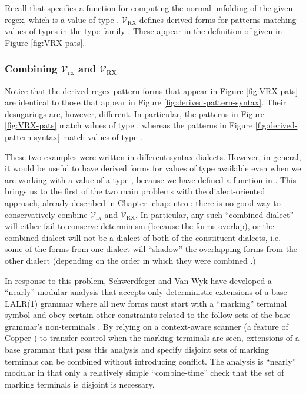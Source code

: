 {Recall that  specifies a function  for computing the normal unfolding of the given regex, which is a value of type . $\mathcal{V}_\text{RX}$ defines derived forms for patterns matching values of types in the type family . These appear in the definition of  given in Figure \ref{fig:VRX-pats}.


\subsubsection{Combining $\mathcal{V}_\text{rx}$ and $\mathcal{V}_\text{RX}$}

Notice that the derived regex pattern forms that appear in Figure \ref{fig:VRX-pats} are identical to those that appear in Figure \ref{fig:derived-pattern-syntax}. Their desugarings are, however, different. In particular, the patterns in Figure \ref{fig:VRX-pats} match values of type , whereas the patterns in Figure \ref{fig:derived-pattern-syntax} match values of type . 

These two examples were written in different syntax dialects. However, in general, it would be useful to have derived forms for values of type  available even when we are working with a value of a type , because we have defined a function  in . This brings us to the first of the two main problems with the dialect-oriented approach, already described in Chapter \ref{chap:intro}: there is no good way to conservatively combine $\mathcal{V}_\text{rx}$ and $\mathcal{V}_\text{RX}$. In particular, any such ``combined dialect'' will either fail to conserve determinism (because the forms overlap), or the combined dialect will not be a dialect of both of the constituent dialects, i.e. some of the forms from one dialect will ``shadow'' the overlapping forms from the other dialect (depending on the order in which they were combined \cite{Ford04a}.) 

In response to this problem, Schwerdfeger and Van Wyk have developed a ``nearly'' modular analysis that accepts only deterministic extensions of a base LALR(1) grammar where all new forms must start with a ``marking'' terminal symbol and obey certain other constraints related to  the follow sets of the base grammar's non-terminals \cite{conf/pldi/SchwerdfegerW09}. By relying on a context-aware scanner (a feature of Copper \cite{conf/gpce/WykS07}) to transfer control when the marking terminals are seen, extensions of a base grammar that pass this analysis and specify disjoint sets of marking terminals can be combined without introducing conflict. The analysis is ``nearly'' modular in that only a relatively simple ``combine-time'' check that the set of marking terminals is disjoint is necessary.

}
